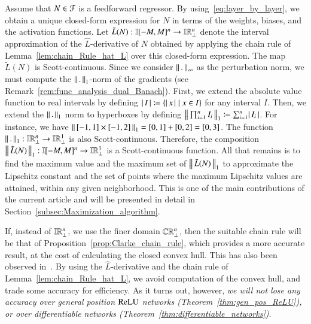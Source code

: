 \documentclass[11pt,times]{article}
\begin{document}
Assume that $N \in {\cal F}$ is a feedforward regressor. By
using~\eqref{eq:layer_by_layer}, we obtain a unique closed-form
expression for $N$ in terms of the weights, biases, and the activation
functions. Let
$\tilde{L}(N): \intvaldom[{[-M,M]^n}] \to \intvaldom[\R^n\lift]$
denote the interval approximation of the $\hat{L}$-derivative of $N$
obtained by applying the chain rule of
Lemma~\ref{lem:chain_Rule_hat_L} over this closed-form expression. The
map $\tilde{L}(N)$ is Scott-continuous. Since we consider
$\norm{.}_{\infty}$ as the perturbation norm, we must compute the
$\norm{.}_1$-norm of the gradients (see
Remark~\ref{rem:func_analysis_dual_Banach}). First, we extend the
absolute value function to real intervals by defining
$\absn{I} \defeq \setbarNormal{\absn{x}}{x \in I}$ for any interval
$I$. Then, we extend the $\norm{.}_1$ norm to hyperboxes by defining
$\norm{\prod_{i=1}^n I_i}_1 \defeq \sum_{i=1}^n \absn{I_i}$. For
instance, we have
$\norm{[-1,1] \times [-1,2]}_1 = [0,1] + [0,2] = [0,3]$. The function
$\norm{.}_1 : \intvaldom[\R^n\lift] \to \intvaldom[\R^1\lift]$ is also
Scott-continuous. Therefore, the composition
$\norm{\tilde{L}(N)}_1: \intvaldom[{[-M,M]^n}] \to
\intvaldom[\R^1\lift]$ is a Scott-continuous function. All that
remains is to find the maximum value and the maximum set of
$\norm{\tilde{L}(N)}_1$ to approximate the Lipschitz constant and the
set of points where the maximum Lipschitz values are attained, within
any given neighborhood. This is one of the main contributions of the
current article and will be presented in detail in
Section~\ref{subsec:Maximization_algorithm}.

If, instead of $\intvaldom[\R^n\lift]$, we use the finer domain
$\cCPPO{\R^n\lift}$, then the suitable chain rule will be that of
Proposition~\ref{prop:Clarke_chain_rule}, which provides a more
accurate result, at the cost of calculating the closed convex
hull. This has also been observed
in~\parencite{Jordan_Dimakis:Provable_ICML:2021}. By using the
$\hat{L}$-derivative and the chain rule of
Lemma~\ref{lem:chain_Rule_hat_L}, we avoid computation of the convex
hull, and trade some accuracy for efficiency. As it turns out,
however, \emph{we will not lose any accuracy over general position
  $\ReLU$ networks (Theorem~\ref{thm:gen_pos_ReLU}), or over
  differentiable networks
  (Theorem~\ref{thm:differentiable_networks})}.
\end{document}
